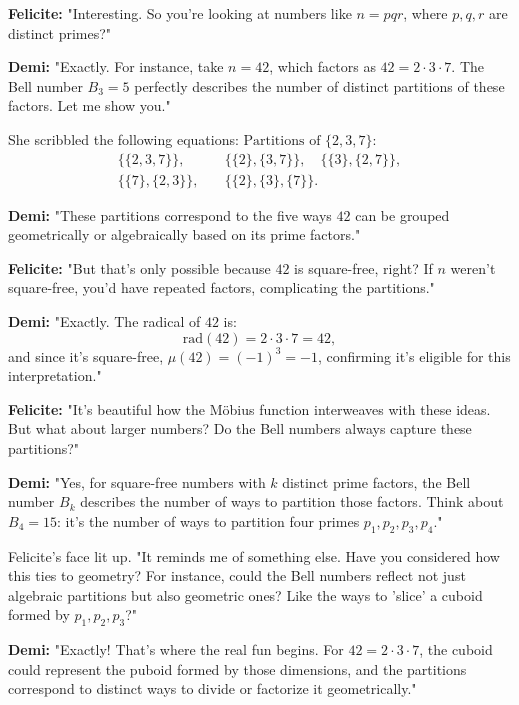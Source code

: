 \textbf{Felicite:} "Interesting. So you’re looking at numbers like \( n = pqr \), where \( p, q, r \) are distinct primes?"

\textbf{Demi:} "Exactly. For instance, take \( n = 42 \), which factors as \( 42 = 2 \cdot 3 \cdot 7 \). The Bell number \( B_3 = 5 \) perfectly describes the number of distinct partitions of these factors. Let me show you."

She scribbled the following equations:
\(
\text{Partitions of } \{2, 3, 7\}: 
\)
\begin{align*}   
\{\{2, 3, 7\}\}, &\quad \{\{2\}, \{3, 7\}\}, \quad \{\{3\}, \{2, 7\}\},\\ \{\{7\}, \{2, 3\}\}, &\quad \{\{2\}, \{3\}, \{7\}\}.
\end{align*}

\textbf{Demi:} "These partitions correspond to the five ways \( 42 \) can be grouped geometrically or algebraically based on its prime factors."

\textbf{Felicite:} "But that’s only possible because \( 42 \) is square-free, right? If \( n \) weren’t square-free, you’d have repeated factors, complicating the partitions."

\textbf{Demi:} "Exactly. The radical of \( 42 \) is:
\[
\mathrm{rad}(42) = 2 \cdot 3 \cdot 7 = 42,
\]
and since it’s square-free, \(\mu(42) = (-1)^3 = -1\), confirming it’s eligible for this interpretation."

\textbf{Felicite:} "It’s beautiful how the Möbius function interweaves with these ideas. But what about larger numbers? Do the Bell numbers always capture these partitions?"

\textbf{Demi:} "Yes, for square-free numbers with \( k \) distinct prime factors, the Bell number \( B_k \) describes the number of ways to partition those factors. Think about \( B_4 = 15 \): it’s the number of ways to partition four primes \( p_1, p_2, p_3, p_4 \)."

Felicite’s face lit up. "It reminds me of something else. Have you considered how this ties to geometry? For instance, could the Bell numbers reflect not just algebraic partitions but also geometric ones? Like the ways to 'slice' a cuboid formed by \( p_1, p_2, p_3 \)?"

\textbf{Demi:} "Exactly! That’s where the real fun begins. For \( 42 = 2 \cdot 3 \cdot 7 \), the cuboid could represent the puboid formed by those dimensions, and the partitions correspond to distinct ways to divide or factorize it geometrically."

